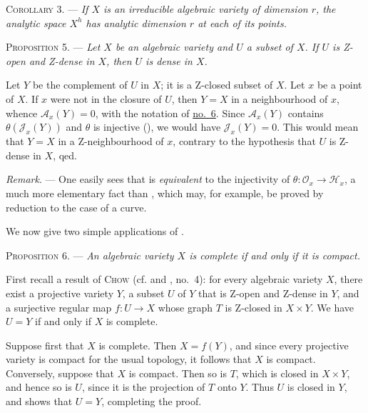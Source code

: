 \textsc{Corollary 3}. --- \emph{If $X$ is an irreducible algebraic variety of dimension $r$, the analytic space $X^h$ has analytic dimension $r$ at each of its points.}


\textsc{Proposition 5}. --- \emph{Let $X$ be an algebraic variety and $U$ a subset of $X$. If $U$ is Z-open and Z-dense in $X$, then $U$ is dense in $X$.}

Let $Y$ be the complement of $U$ in $X$; it is a Z-closed subset of $X$. Let $x$ be a point of $X$. If $x$ were not in the closure of $U$, then $Y=X$ in a neighbourhood of $x$, whence $\mathcal{A}_x(Y)=0$, with the notation of \hyperref[gaga:no:6]{no.~6}. Since $\mathcal{A}_x(Y)$ contains $\theta(\mathcal{J}_x(Y))$ and $\theta$ is injective (), we would have $\mathcal{J}_x(Y)=0$. This would mean that $Y=X$ in a Z-neighbourhood of $x$, contrary to the hypothesis that $U$ is Z-dense in $X$, qed.

\emph{Remark}. --- One easily sees that  is \emph{equivalent} to the injectivity of $\theta:\mathcal{O}_x\to\mathcal{H}_x$, a much more elementary fact than , which may, for example, be proved by reduction to the case of a curve.

We now give two simple applications of .

\textsc{Proposition 6}. --- \emph{An algebraic variety $X$ is complete if and only if it is compact.}

First recall a result of \textsc{Chow} (cf.  and , no.~4): for every algebraic variety $X$, there exist a projective variety $Y$, a subset $U$ of $Y$ that is Z-open and Z-dense in $Y$, and a surjective regular map $f:U\to X$ whose graph $T$ is Z-closed in $X\times Y$. We have $U=Y$ if and only if $X$ is complete.

Suppose first that $X$ is complete. Then $X=f(Y)$, and since every projective variety is compact for the usual topology, it follows that $X$ is compact. Conversely, suppose that $X$ is compact. Then so is $T$, which is closed in $X\times Y$, and hence so is $U$, since it is the projection of $T$ onto $Y$. Thus $U$ is closed in $Y$, and  shows that $U=Y$, completing the proof.

